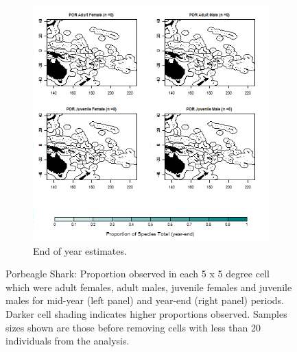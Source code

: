 \documentclass[12pt]{SCreport}
\begin{document}
\begin{landscape}
\begin{figure}
\begin{subfigure}[b]{0.6\textwidth}
       \includegraphics[width=\textwidth]{../GRAPHICS/Defined/BI_29_Map_maturity_sex_POR}
       \caption{End of year estimates.}
       \label{fig:test2}
   \end{subfigure}
\caption{Porbeagle Shark: Proportion observed in each 5 x 5 degree cell which were adult females, adult males, juvenile females and juvenile males for mid-year (left panel) and year-end (right panel) periods. Darker cell shading indicates higher proportions observed. Samples sizes shown are those before removing cells with less than 20 individuals from the analysis. }
\label{fig:test} 
\end{figure}
\end{landscape}
\end{document}
